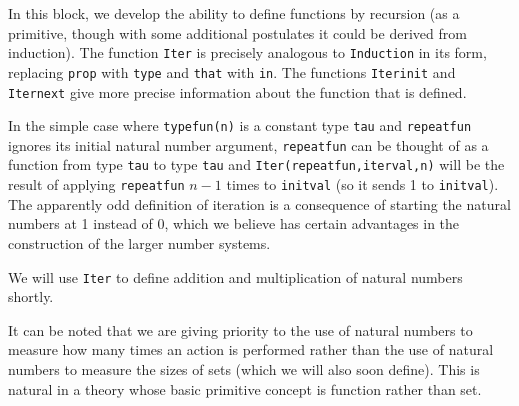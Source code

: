 \documentclass[12pt]{article}
\begin{document}
In this block, we develop the ability to define functions by recursion (as a primitive, though with some additional postulates it could be derived
from induction).   The function {\tt Iter} is precisely analogous to {\tt Induction} in its form, replacing {\tt prop} with {\tt type} and 
{\tt that} with {\tt in}.  The functions {\tt Iterinit} and {\tt Iternext} give more precise information about the function that is defined.

In the simple case where {\tt typefun(n)} is a constant type {\tt tau} and {\tt repeatfun} ignores its initial natural number argument,  {\tt repeatfun} can be thought of as a function from type {\tt tau} to type {\tt tau}
and {\tt Iter(repeatfun,iterval,n)} will be the result of applying {\tt repeatfun} $n-1$ times to {\tt initval} (so it sends 1 to {\tt initval}).  The apparently odd definition of iteration is a consequence of starting the natural numbers at 1 instead of 0, which we believe has certain advantages in the construction of the larger number systems.

We will use {\tt Iter} to define addition and multiplication of natural numbers shortly.

It can be noted that we are giving priority to the use of natural numbers to measure how many times an action is performed rather than the use of natural numbers to measure the sizes of sets (which we will also soon define).  This is natural in a theory whose basic primitive concept is function rather than set.
\end{document}
